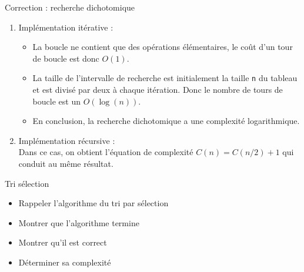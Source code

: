 \documentclass[10pt]{beamer}
\begin{document}
\begin{frame}[fragile]{\Ctitle}{\stitle}
    \begin{exampleblock}{Correction : recherche dichotomique}
        \begin{enumerate}
        \item Implémentation itérative :
        \begin{itemize}
        \item<2->\textcolor{OliveGreen}{La boucle ne contient que des opérations élémentaires, le coût d'un tour de boucle est donc $O(1)$.}
        \item<3->\textcolor{OliveGreen}{La taille de l'intervalle de recherche est initialement la taille {\tt n} du tableau et est divisé par deux à chaque itération. Donc le nombre de tours de boucle est un $O(\log(n))$.}
        \item<4->\textcolor{OliveGreen}{En conclusion, la recherche dichotomique a une complexité logarithmique.}
        \end{itemize}
        \item<5-> Implémentation récursive :\\
        \textcolor{OliveGreen}{Dans ce cas, on obtient l'équation de complexité $C(n) = C(n/2) + 1$} qui conduit au même résultat.
    \end{enumerate}
    \end{exampleblock}
\end{frame}


\begin{frame}[fragile]{\Ctitle}{\stitle}
    \begin{exampleblock}{Tri sélection}
        \begin{itemize}
            \item<1-> Rappeler l'algorithme du tri par sélection \\
            \item<3-> Montrer que l'algorithme termine\\
            \item<5-> Montrer qu'il est correct
            \item<6-> Déterminer sa complexité
        \end{itemize}
    \end{exampleblock}
\end{frame}
\end{document}
